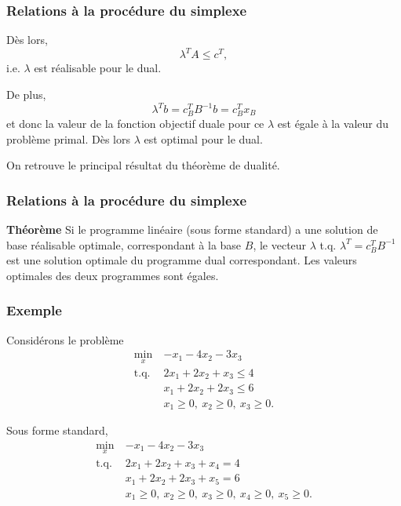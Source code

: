 \documentclass[usepdftitle=false]{beamer}
\begin{document}
\begin{frame}
	\frametitle{Relations à la procédure du simplexe}
	
	Dès lors,
	\[
	\lambda^T A \leq c^T,
	\]
	i.e. $\lambda$ est réalisable pour le dual.
	
	\mbox{}
	
	De plus,
	\[
	\lambda^T b = c_B^T B^{-1}b = c_B^T x_B
	\]
	et donc la valeur de la fonction objectif duale pour ce $\lambda$ est égale à la valeur du problème primal. Dès lors $\lambda$ est optimal pour le dual.
	
	\mbox{}
	
	On retrouve le principal résultat du théorème de dualité.
	
\end{frame}

\begin{frame}
	\frametitle{Relations à la procédure du simplexe}
	
	{\bf Théorème}
	Si le programme linéaire (sous forme standard) a une solution de base réalisable optimale, correspondant à la base $B$, le vecteur $\lambda$ t.q. $\lambda^T = c_B^T B^{-1}$ est une solution optimale du programme dual correspondant.
	Les valeurs optimales des deux programmes sont égales.
	
\end{frame}

\begin{frame}
	\frametitle{Exemple}
	
	Considérons le problème
	\begin{align*}
		\min_x \ & -x_1 - 4x_2 -3x_3 \\
		\mbox{t.q. } & 2x_1 + 2x_2 + x_3 \leq 4 \\
		& x_1 + 2x_2 + 2x_3 \leq 6 \\
		& x_1 \geq 0,\ x_2 \geq 0,\ x_3 \geq 0.
	\end{align*}
	
	\mbox{}
	
	Sous forme standard,
	\begin{align*}
		\min_x \ & -x_1 - 4x_2 -3x_3 \\
		\mbox{t.q. } & 2x_1 + 2x_2 + x_3 + x_4 = 4 \\
		& x_1 + 2x_2 + 2x_3 + x_5 = 6 \\
		& x_1 \geq 0,\ x_2 \geq 0,\ x_3 \geq 0,\ x_4 \geq 0,\ x_5 \geq 0.
	\end{align*}
	
\end{frame}
\end{document}

